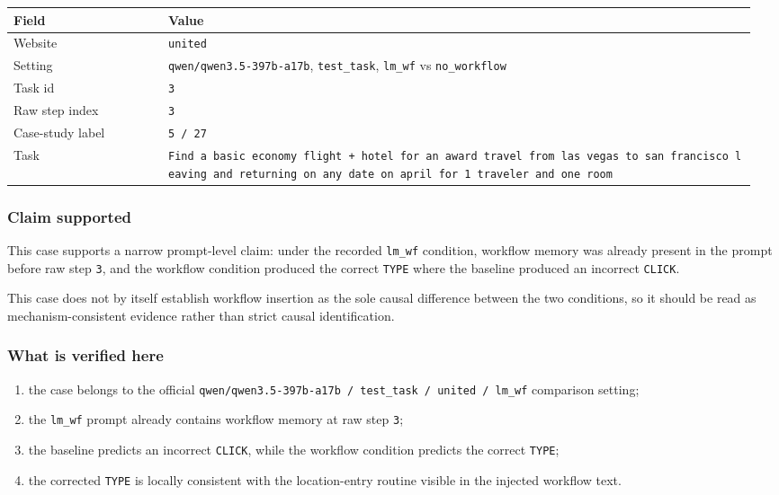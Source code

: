 {\def\LTcaptype{} %
\begin{longtable}[]{@{}>{\raggedright\arraybackslash}p{0.20\linewidth}>{\raggedright\arraybackslash}p{0.76\linewidth}@{}}
\toprule\noalign{}
Field & Value \\
\midrule\noalign{}
\endhead
\bottomrule\noalign{}
\endlastfoot
Website & \texttt{united} \\
Setting & \texttt{qwen/qwen3.5-397b-a17b}, \texttt{test\_task},
\texttt{lm\_wf} vs \texttt{no\_workflow} \\
Task id & \texttt{3} \\
Raw step index & \texttt{3} \\
Case-study label & \texttt{5\ /\ 27} \\
Task &
\texttt{Find\ a\ basic\ economy\ flight\ +\ hotel\ for\ an\ award\ travel\ from\ las\ vegas\ to\ san\ francisco\ leaving\ and\ returning\ on\ any\ date\ on\ april\ for\ 1\ traveler\ and\ one\ room} \\
\end{longtable}
}

\subsubsection{Claim supported}

This case supports a narrow prompt-level claim: under the recorded
\texttt{lm\_wf} condition, workflow memory was already present in the
prompt before raw step \texttt{3}, and the workflow condition produced
the correct \texttt{TYPE} where the baseline produced an incorrect
\texttt{CLICK}.

This case does not by itself establish workflow insertion as the sole
causal difference between the two conditions, so it should be read as
mechanism-consistent evidence rather than strict causal identification.

\subsubsection{What is verified here}

\begin{enumerate}
\def\labelenumi{\arabic{enumi}.}
\tightlist
\item the case belongs to the official \texttt{qwen/qwen3.5-397b-a17b / test\_task / united / lm\_wf} comparison setting;
\item the \texttt{lm\_wf} prompt already contains workflow memory at raw step \texttt{3};
\item the baseline predicts an incorrect \texttt{CLICK}, while the workflow condition predicts the correct \texttt{TYPE};
\item the corrected \texttt{TYPE} is locally consistent with the location-entry routine visible in the injected workflow text.
\end{enumerate}

